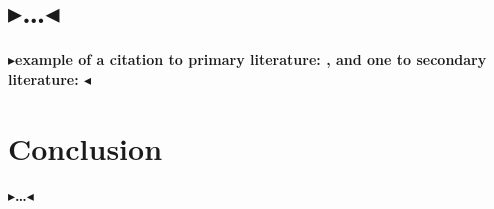 \documentclass[a4paper]{article}
\newcommand{\todo}[1]{{\color[rgb]{.5,0,0}\textbf{$\blacktriangleright$#1$\blacktriangleleft$}}}
\begin{document}
\chapter{\todo{\dots}}
\label{ch:main}

\todo{example of a citation to primary literature: \cite{lazypropagation2010},
and one to secondary literature: \cite{ambiguity2010}}


\chapter{Conclusion}
\label{ch:conclusion}

\todo{\dots}




\end{document}
